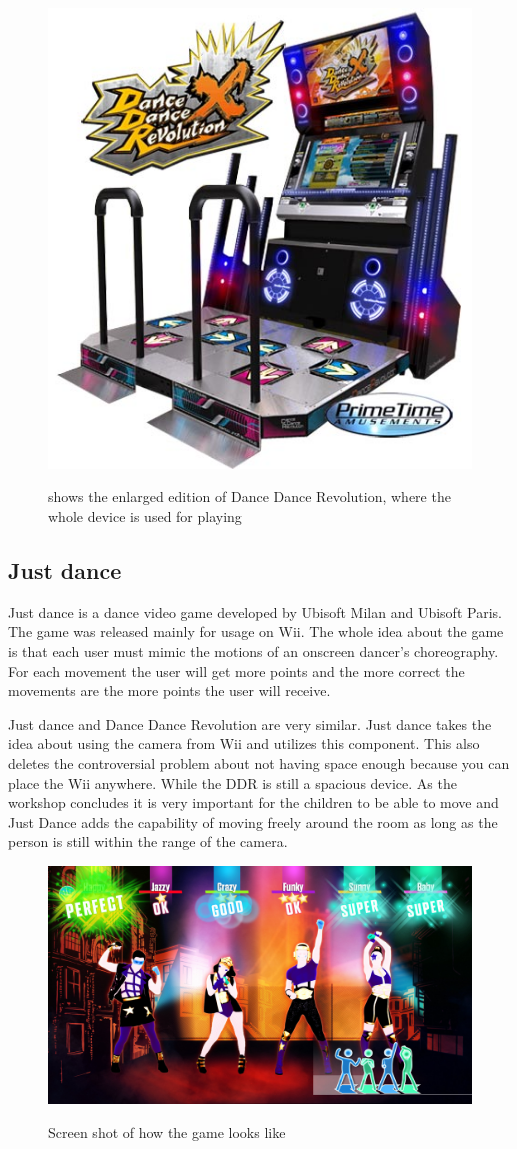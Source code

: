 \begin{figure}[H]
	\centering
	\includegraphics[width=0.7\linewidth]{figure/Analysis/dancedance}
	\label{fig:dancedance}
	\caption{shows the enlarged edition of Dance Dance Revolution, where the whole device is used for playing}
\end{figure}

\subsection{Just dance}
Just dance is a dance video game developed by Ubisoft Milan and Ubisoft Paris. The game was released mainly for usage on Wii. The whole idea about the game is that each user must mimic the motions of an onscreen dancer’s choreography. For each movement the user will get more points and the more correct the movements are the more points the user will receive.

Just dance and Dance Dance Revolution are very similar. Just dance takes the idea about using the camera from Wii and utilizes this component. This also deletes the controversial problem about not having space enough because you can place the Wii anywhere. While the DDR is still a spacious device. As the workshop concludes it is very important for the children to be able to move and Just Dance adds the capability of moving freely around the room as long as the person is still within the range of the camera.
\begin{figure}[H]
	\centering
	\includegraphics[width=0.7\linewidth]{figure/Analysis/justdance}
	\label{fig:Just Dance}
	\caption{Screen shot of how the game looks like}
\end{figure}

